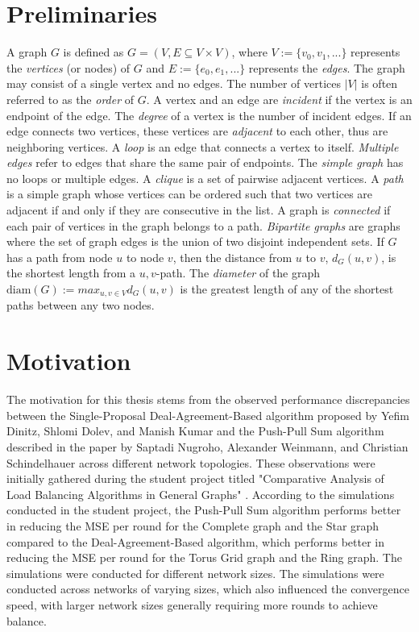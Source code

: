 \section{Preliminaries}\label{sec:prelimn}
A graph $G$ is defined as $G = (V, E \subseteq V \times V)$, where $V := \{v_0, v_1,...\}$ represents the \textit{vertices} (or nodes) of $G$ and $E := \{e_0, e_1,...\}$ represents the \textit{edges}. The graph may consist of a single vertex and no edges. The number of vertices $|V|$ is often referred to as the \textit{order} of $G$. A vertex and an edge are \textit{incident} if the vertex is an endpoint of the edge. The \textit{degree} of a vertex is the number of incident edges. If an edge connects two vertices, these vertices are \textit{adjacent} to each other, thus are neighboring vertices. A \textit{loop} is an edge that connects a vertex to itself. \textit{Multiple edges} refer to edges that share the same pair of endpoints. The \textit{simple graph} has no loops or multiple edges. A \textit{clique} is a set of pairwise adjacent vertices. A \textit{path} is a simple graph whose vertices can be ordered such that two vertices are adjacent if and only if they are consecutive in the list. A graph is \textit{connected} if each pair of vertices in the graph belongs to a path. \textit{Bipartite graphs} are graphs where the set of graph edges is the union of two disjoint independent sets. If $G$ has a path from node $u$ to node $v$, then the distance from $u$ to $v$, $d_G(u,v)$, is the shortest length from a $u,v$-path. The \textit{diameter} of the graph $\text{diam} (G) := max_{u,v\in V}d_G(u,v)$ is the greatest length of any of the shortest paths between any two nodes. \cite{GraphTheorySchindelhaauer2021}

\section{Motivation}\label{sec:motivation}
The motivation for this thesis stems from the observed performance discrepancies between the Single-Proposal Deal-Agreement-Based algorithm proposed by Yefim Dinitz, Shlomi Dolev, and Manish Kumar \cite{Dinitz2023DAB} and the Push-Pull Sum algorithm described in the paper by Saptadi Nugroho, Alexander Weinmann, and Christian Schindelhauer \cite{nugroho2023PushPullSumDataAg} across different network topologies. These observations were initially gathered during the student project titled "Comparative Analysis of Load Balancing Algorithms in General Graphs" \cite{Bayazitoglu}. According to the simulations conducted in the student project, the Push-Pull Sum algorithm performs better in reducing the MSE per round for the Complete graph and the Star graph compared to the Deal-Agreement-Based algorithm, which performs better in reducing the MSE per round for the Torus Grid graph and the Ring graph. The simulations were conducted for different network sizes. The simulations were conducted across networks of varying sizes, which also influenced the convergence speed, with larger network sizes generally requiring more rounds to achieve balance.

